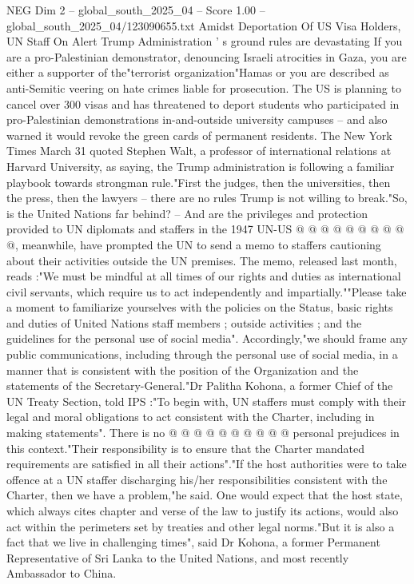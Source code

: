 \begin{textsample}{NEG Dim 2 – global\_south\_2025\_04 – Score 1.00 – global\_south\_2025\_04/123090655.txt}  \label{ex:f2_neg_094}
Amidst Deportation Of US Visa Holders, UN Staff On Alert Trump Administration ' s ground rules are devastating If you are a pro-Palestinian demonstrator, denouncing Israeli atrocities in Gaza, you are either a supporter of the"terrorist organization"Hamas or you are described as anti-Semitic veering on hate crimes liable for prosecution.
The US is planning to cancel over 300 visas and has threatened to deport students who participated in pro-Palestinian demonstrations in-and-outside university campuses -- and also warned it would revoke the green cards of permanent residents.
The New York Times March 31 quoted Stephen Walt, a professor of international relations at Harvard University, as saying, the Trump administration is following a familiar playbook towards strongman rule."First the judges, then the universities, then the press, then the lawyers -- there are no rules Trump is not willing to break."So, is the United Nations far behind? -- And are the privileges and protection provided to UN diplomats and staffers in the 1947 UN-US @ @ @ @ @ @ @ @ @ @, meanwhile, have prompted the UN to send a memo to staffers cautioning about their activities outside the UN premises.
The memo, released last month, reads :"We must be mindful at all times of our rights and duties as international civil servants, which require us to act independently and impartially.""Please take a moment to familiarize yourselves with the policies on the Status, basic rights and duties of United Nations staff members ; outside activities ; and the guidelines for the personal use of social media".
Accordingly,"we should frame any public communications, including through the personal use of social media, in a manner that is consistent with the position of the Organization and the statements of the Secretary-General."Dr Palitha Kohona, a former Chief of the UN Treaty Section, told IPS :"To begin with, UN staffers must comply with their legal and moral obligations to act consistent with the Charter, including in making statements".
There is no @ @ @ @ @ @ @ @ @ @ personal prejudices in this context."Their responsibility is to ensure that the Charter mandated requirements are satisfied in all their actions"."If the host authorities were to take offence at a UN staffer discharging his/her responsibilities consistent with the Charter, then we have a problem,"he said.
One would expect that the host state, which always cites chapter and verse of the law to justify its actions, would also act within the perimeters set by treaties and other legal norms."But it is also a fact that we live in challenging times", said Dr Kohona, a former Permanent Representative of Sri Lanka to the United Nations, and most recently Ambassador to China.

\end{textsample}
